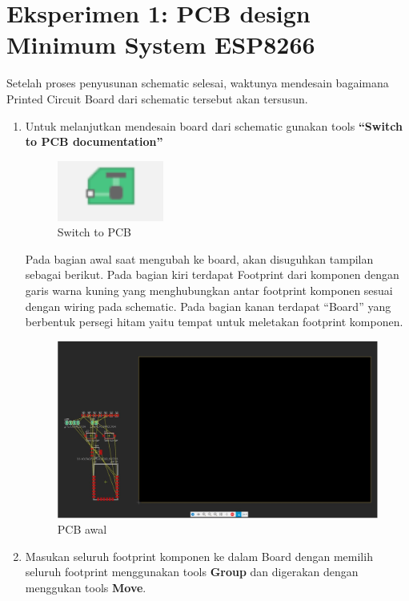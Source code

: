 \section{Eksperimen 1: PCB design Minimum System ESP8266}
Setelah proses penyusunan schematic selesai, waktunya mendesain bagaimana Printed Circuit Board
dari schematic tersebut akan tersusun.
\begin{enumerate}
    \item Untuk melanjutkan mendesain board dari schematic gunakan tools \textbf{“Switch to PCB
    documentation”}
    \begin{figure}[H]
        \centering
        \includegraphics[width=0.4\linewidth]{P2/img/switchtopcb.png}
        \caption{Switch to PCB} 
        \label{fig:Switch to PCB}
    \end{figure}
    Pada bagian awal saat mengubah ke board, akan disuguhkan tampilan sebagai berikut. Pada
    bagian kiri terdapat Footprint dari komponen dengan garis warna kuning yang
    menghubungkan antar footprint komponen sesuai dengan wiring pada schematic. Pada
    bagian kanan terdapat “Board” yang berbentuk persegi hitam yaitu tempat untuk meletakan
    footprint komponen.
    \begin{figure}[H]
        \centering
        \includegraphics[width=0.6\linewidth]{P2/img/awal_switch_ke_pcb_design.jpg}
        \caption{PCB awal} 
        \label{fig:PCBawal}
    \end{figure}
    \vspace{-\topsep}
    \item Masukan seluruh footprint komponen ke dalam Board dengan memilih seluruh footprint menggunakan tools \textbf{Group} dan digerakan dengan menggukan tools \textbf{Move}.
    \begin{figure}[H]

\end{figure}
\end{enumerate}
